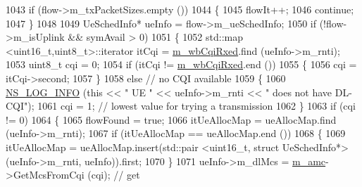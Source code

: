 \begin{DoxyCode}
1043                                 \textcolor{keywordflow}{if} (flow->m\_txPacketSizes.empty ())
1044                                 \{
1045                                         flowIt++;
1046                                         \textcolor{keywordflow}{continue};
1047                                 \}
1048 
1049                                 UeSchedInfo* ueInfo = flow->m\_ueSchedInfo;
1050                                 \textcolor{keywordflow}{if} (!flow->m\_isUplink && symAvail > 0)
1051                                 \{
1052                                         std::map <uint16\_t,uint8\_t>::iterator itCqi = 
      \hyperlink{classns3_1_1MmWaveFlexTtiMaxWeightMacScheduler_a46c51259ff3607f3ef2f4684485f274c}{m\_wbCqiRxed}.find (ueInfo->m\_rnti);
1053                                         uint8\_t cqi = 0;
1054                                         \textcolor{keywordflow}{if} (itCqi != \hyperlink{classns3_1_1MmWaveFlexTtiMaxWeightMacScheduler_a46c51259ff3607f3ef2f4684485f274c}{m\_wbCqiRxed}.end ())
1055                                         \{
1056                                                 cqi = itCqi->second;
1057                                         \}
1058                                         \textcolor{keywordflow}{else} \textcolor{comment}{// no CQI available}
1059                                         \{
1060                                                 \hyperlink{group__logging_gafbd73ee2cf9f26b319f49086d8e860fb}{NS\_LOG\_INFO} (\textcolor{keyword}{this} << \textcolor{stringliteral}{" UE "} << ueInfo->m\_rnti <<
       \textcolor{stringliteral}{" does not have DL-CQI"});
1061                                                 cqi = 1; \textcolor{comment}{// lowest value for trying a transmission}
1062                                         \}
1063                                         \textcolor{keywordflow}{if} (cqi != 0)
1064                                         \{
1065                                                 flowFound = \textcolor{keyword}{true};
1066                                                 itUeAllocMap = ueAllocMap.find (ueInfo->m\_rnti);
1067                                                 \textcolor{keywordflow}{if} (itUeAllocMap == ueAllocMap.end ())
1068                                                 \{
1069                                                         itUeAllocMap = ueAllocMap.insert(std::pair
       <uint16\_t, struct UeSchedInfo*> (ueInfo->m\_rnti, ueInfo)).first;
1070                                                 \}
1071                                                 ueInfo->m\_dlMcs = \hyperlink{classns3_1_1MmWaveFlexTtiMaxWeightMacScheduler_a36c22ad89fe5d6743a058f253a43a70d}{m\_amc}->GetMcsFromCqi (cqi);  \textcolor{comment}{// get
}
\end{DoxyCode}
